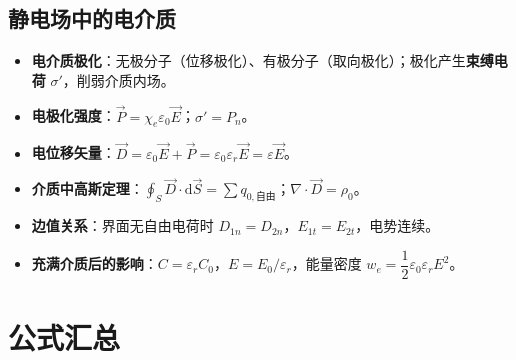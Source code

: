 \documentclass[12pt,a4paper]{ctexart}
\begin{document}
\subsection{静电场中的电介质}

\begin{itemize}
    \item \textbf{电介质极化}：无极分子（位移极化）、有极分子（取向极化）；极化产生\textbf{束缚电荷} $\sigma'$，削弱介质内场。
    \item \textbf{电极化强度}：$\vec P=\chi_e\varepsilon_0\vec E$；$\sigma'=P_n$。
    \item \textbf{电位移矢量}：$\vec D=\varepsilon_0\vec E+\vec P=\varepsilon_0\varepsilon_r\vec E=\varepsilon\vec E$。
    \item \textbf{介质中高斯定理}：$\displaystyle\oint_S \vec D\cdot\mathrm d\vec S=\sum q_{0,\text{自由}}$；$\nabla\cdot\vec D=\rho_0$。
    \item \textbf{边值关系}：界面无自由电荷时 $D_{1n}=D_{2n}$，$E_{1t}=E_{2t}$，电势连续。
    \item \textbf{充满介质后的影响}：$C=\varepsilon_r C_0$，$E=E_0/\varepsilon_r$，能量密度 $w_e=\dfrac{1}{2}\varepsilon_0\varepsilon_r E^2$。
\end{itemize}

\section{公式汇总}
\end{document}

